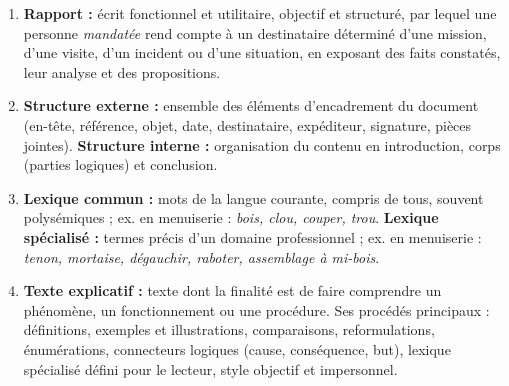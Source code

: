 \documentclass[11pt]{article}
\begin{document}
\begin{corrige}
\begin{enumerate}
    \item \textbf{Rapport :} écrit fonctionnel et utilitaire, objectif et structuré, par lequel une personne \emph{mandatée} rend compte à un destinataire déterminé d'une mission, d'une visite, d'un incident ou d'une situation, en exposant des faits constatés, leur analyse et des propositions.
    \item \textbf{Structure externe :} ensemble des éléments d'encadrement du document (en-tête, référence, objet, date, destinataire, expéditeur, signature, pièces jointes). \textbf{Structure interne :} organisation du contenu en introduction, corps (parties logiques) et conclusion.
    \item \textbf{Lexique commun :} mots de la langue courante, compris de tous, souvent polysémiques ; ex. en menuiserie : \emph{bois, clou, couper, trou}. \textbf{Lexique spécialisé :} termes précis d'un domaine professionnel ; ex. en menuiserie : \emph{tenon, mortaise, dégauchir, raboter, assemblage à mi-bois}.
    \item \textbf{Texte explicatif :} texte dont la finalité est de faire comprendre un phénomène, un fonctionnement ou une procédure. Ses procédés principaux : définitions, exemples et illustrations, comparaisons, reformulations, énumérations, connecteurs logiques (cause, conséquence, but), lexique spécialisé défini pour le lecteur, style objectif et impersonnel.
\end{enumerate}
\end{corrige}
\end{document}
